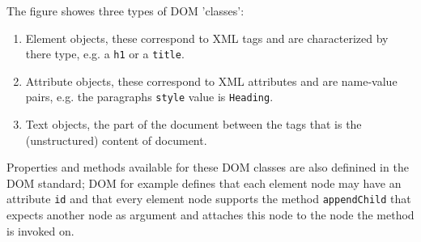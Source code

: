 The figure showes three types of DOM 'classes': 

\begin{enumerate}
	\item Element objects, these correspond to XML tags and are characterized by there type, e.g. a \texttt{h1} or a \texttt{title}.
	\item Attribute objects, these correspond to XML attributes and are name-value pairs, e.g. the paragraphs \texttt{style} value is \texttt{Heading}.
	\item Text objects, the part of the document between the tags that is the (unstructured) content of document.
	
\end{enumerate}

Properties and methods available for these DOM classes are also definined in the DOM standard; DOM for example defines that each element node may have an attribute \texttt{id} and that every element node supports the method \texttt{appendChild} that expects another node as argument and attaches this node to the node the method is invoked on.